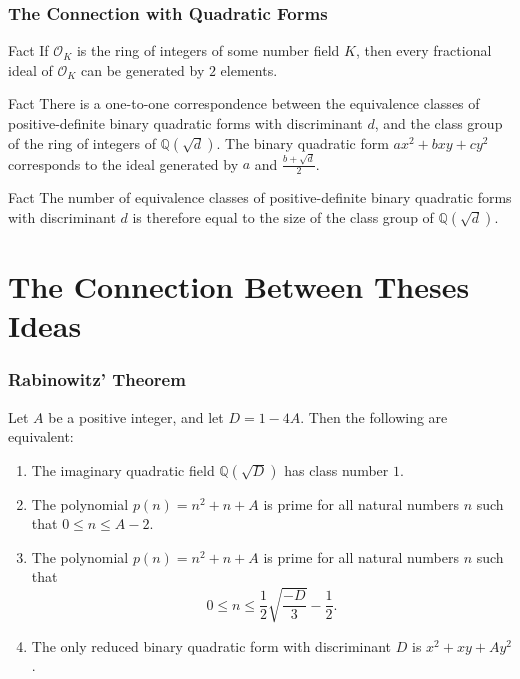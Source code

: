 \documentclass[handout]{beamer}
\begin{document}
\begin{frame}
	
	\frametitle{The Connection with Quadratic Forms}

	\begin{block}{Fact}
		If $\mathcal{O}_K$ is the ring of integers of some number field $K$, then every fractional ideal of $\mathcal{O}_K$ can be generated by $2$ elements.
	\end{block}
	\pause

	\begin{block}{Fact}
		There is a one-to-one correspondence between the equivalence classes of positive-definite binary quadratic forms with discriminant $d$, and the class group of the ring of integers of $\mathbb{Q}(\sqrt{d})$. The binary quadratic form $ax^2 + bxy + cy^2$ corresponds to the ideal generated by $a$ and $\frac{b + \sqrt{d}}{2}$.
	\end{block}
	\pause

	\begin{block}{Fact}
		The number of equivalence classes of positive-definite binary quadratic forms with discriminant $d$ is therefore equal to the size of the class group of $\mathbb{Q}(\sqrt{d})$.
	\end{block}

\end{frame}

\section{The Connection Between Theses Ideas}

\begin{frame}

	\frametitle{Rabinowitz' Theorem}

	\begin{theorem}
	Let $A$ be a positive integer, and let $D = 1 - 4A$. Then the following are equivalent:
	\begin{enumerate}
		\item The imaginary quadratic field $\mathbb{Q}(\sqrt{D})$ has class number $1$.
		\item The polynomial $p(n) = n^2 + n + A$ is prime for all natural numbers $n$ such that $0 \leq n \leq A - 2$.
		\item The polynomial $p(n) = n^2 + n + A$ is prime for all natural numbers $n$ such that
			\[
				0 \leq n \leq \frac{1}{2} \sqrt{\frac{-D}{3}} - \frac{1}{2}.
			\]
		\item The only reduced binary quadratic form with discriminant $D$ is $x^2 + xy + Ay^2$.
	\end{enumerate}
\end{theorem}

\end{frame}
\end{document}
